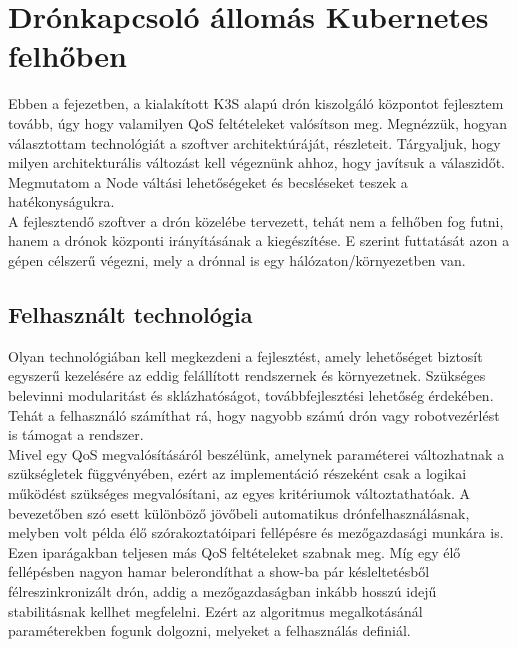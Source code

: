 \chapter{Drónkapcsoló állomás Kubernetes felhőben}
Ebben a fejezetben, a kialakított K3S alapú drón kiszolgáló központot fejlesztem tovább, úgy hogy valamilyen QoS feltételeket valósítson meg. Megnézzük, hogyan választottam technológiát a szoftver architektúráját, részleteit. Tárgyaljuk, hogy milyen architekturális változást kell végeznünk ahhoz, hogy javítsuk a válaszidőt. Megmutatom a Node váltási lehetőségeket és becsléseket teszek a hatékonyságukra. \\

\noindent
A fejlesztendő szoftver a drón közelébe tervezett, tehát nem a felhőben fog futni, hanem a drónok központi irányításának a kiegészítése. E szerint futtatását azon a gépen célszerű végezni, mely a drónnal is egy hálózaton/környezetben van.

\section{Felhasznált technológia}
Olyan technológiában kell megkezdeni a fejlesztést, amely lehetőséget biztosít egyszerű kezelésére az eddig felállított rendszernek és környezetnek. Szükséges belevinni modularitást és sklázhatóságot, továbbfejlesztési lehetőség érdekében. Tehát a felhasználó számíthat rá, hogy nagyobb számú drón vagy robotvezérlést is támogat a rendszer. \\

\noindent
Mivel egy QoS megvalósításáról beszélünk, amelynek paraméterei változhatnak a szükségletek függvényében, ezért az implementáció részeként csak a logikai működést szükséges megvalósítani, az egyes kritériumok változtathatóak. A bevezetőben szó esett különböző jövőbeli automatikus drónfelhasználásnak, melyben volt példa élő szórakoztatóipari fellépésre és mezőgazdasági munkára is. Ezen iparágakban teljesen más QoS feltételeket szabnak meg. Míg egy élő fellépésben nagyon hamar belerondíthat a show-ba pár késleltetésből félreszinkronizált drón, addig a mezőgazdaságban inkább hosszú idejű stabilitásnak kellhet megfelelni. Ezért az algoritmus megalkotásánál paraméterekben fogunk dolgozni, melyeket a felhasználás definiál.

